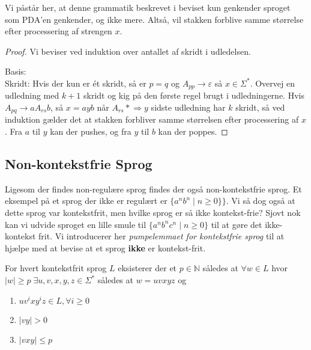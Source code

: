 Vi påstår her, at denne grammatik beskrevet i beviset kun genkender sproget som PDA'en genkender, og ikke mere. Altså, vil stakken forblive samme størrelse efter processering af strengen $x$.

\begin{proof}
Vi beviser ved induktion over antallet af skridt i udledelsen.

Basis:\\
 Skridt: Hvis der kun er ét skridt, så er $p = q$ og $A_{pp} \rightarrow \varepsilon$ så $x \in \Sigma^{*}$.
Overvej en udledning med $k+1$ skridt og kig på den første regel brugt i udledningerne. Hvis $A_{pq} \rightarrow aA_{rs}b$, så $x = ayb$ når $A_{rs} \mathrel{*}{\Rightarrow} y$ sidste udledning har $k$ skridt, så ved induktion gælder det at stakken forbliver samme størrelsen efter processering af $x$. Fra $a$ til $y$ kan der pushes, og fra $y$ til $b$ kan der poppes.
\end{proof}


\newpage
\subsection{Non-kontekstfrie Sprog}%
\label{subsec:noncfl}

Ligesom der findes non-regulære sprog findes der også non-kontekstfrie sprog. Et eksempel på et sprog der ikke er regulært er $\{a^{n}b^{n} \;|\; n \ge 0\}\}$. Vi så dog også at dette sprog var kontekstfrit, men hvilke sprog er så ikke kontekst-frie? Sjovt nok kan vi udvide sproget en lille smule til $\{a^{n}b^{n}c^{n} \;|\; n \ge 0\}$ til at gøre det ikke-kontekst frit. Vi introducerer her \textit{pumpelemmaet for kontekstfrie sprog} til at hjælpe med at bevise at et sprog \textbf{ikke} er kontekst-frit.

\begin{theorem}
  For hvert kontekstfrit sprog $L$ eksisterer der et $p \in \mathbb{N}$ således at $\forall w \in L$ hvor $|w| \geq p\; \exists u,v,x,y,z \in \Sigma^{*}$ således at $w = uvxyz$ og
  \begin{enumerate}
    \item $uv^{i}xy^{i}z \in L, \forall i \ge 0$
    \item $|vy| > 0$
    \item $|vxy| \le p$
  \end{enumerate}
\end{theorem}

